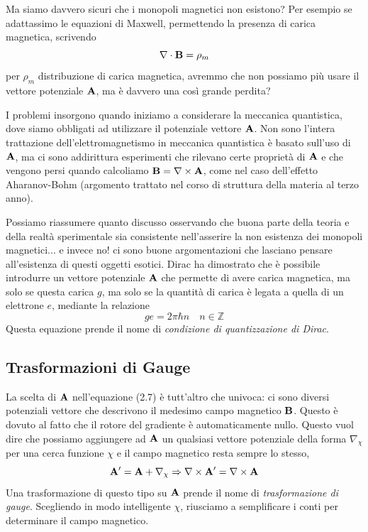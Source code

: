 \noindent Ma siamo davvero sicuri che i monopoli magnetici non esistono?   Per esempio se  adattassimo le equazioni di Maxwell, permettendo la presenza di carica magnetica, scrivendo
\begin{equation*}
	\nabla \cdot \bold{B} = \rho_m
\end{equation*}
per $\rho_m$ distribuzione di carica magnetica, avremmo che non possiamo pi\`u usare il vettore potenziale $\bold{A}$, ma \`e davvero una cos\`i grande perdita?
\newline

I problemi insorgono quando iniziamo a considerare la meccanica quantistica, dove siamo obbligati ad utilizzare il potenziale vettore $\bold{A}$. Non sono l'intera trattazione dell'elettromagnetismo in meccanica quantistica \`e basato sull'uso di $\bold{A}$, ma ci sono addirittura esperimenti che rilevano certe propriet\`a di $\bold{A}$ e che vengono persi quando calcoliamo $\bold{B} = \nabla \times \bold{A}$, come nel caso dell'effetto Aharanov-Bohm (argomento trattato nel corso di struttura della materia al terzo anno).

Possiamo riassumere quanto discusso osservando che buona parte della teoria e della realt\`a sperimentale sia consistente nell'asserire la non esistenza dei monopoli magnetici... e invece no! ci sono buone argomentazioni che lasciano pensare all'esistenza di questi oggetti esotici. Dirac  ha dimostrato che \`e possibile introdurre un vettore potenziale $\bold{A}$ che permette di avere carica magnetica, ma solo se questa carica $g$, ma solo se la quantit\`a di carica \`e legata a quella di un elettrone $e$, mediante la relazione 
\begin{equation*}
	ge = 2 \pi \hbar n \quad n \in \mathbb{Z}
\end{equation*}
Questa equazione prende il nome di \textit{condizione di quantizzazione di Dirac}.

\subsection{Trasformazioni di Gauge}

La scelta di $\bold{A}$ nell'equazione (2.7) \`e tutt'altro che univoca: ci sono diversi potenziali vettore che descrivono il medesimo campo magnetico $\bold{B}$. Questo \`e dovuto al fatto che il rotore del gradiente \`e automaticamente nullo. Questo vuol dire che possiamo aggiungere ad $\bold{A}$ un qualsiasi vettore potenziale della forma $\nabla_{\chi}$ per una cerca funzione $\chi$ e il campo magnetico resta sempre lo stesso,
\begin{equation*}
	\bold{A}' = \bold{A} + \nabla_{\chi} \Rightarrow \nabla \times \bold{A}' = \nabla \times \bold{A}
\end{equation*}
Una trasformazione di questo tipo su $\bold{A}$ prende il nome di \textit{trasformazione di gauge}. Scegliendo in modo intelligente $\chi$, riusciamo a semplificare i conti per determinare il campo magnetico.

